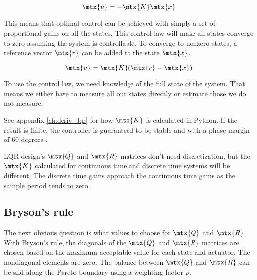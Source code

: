 \begin{theorem}
  \label{thm:optimal_control_law}

  \begin{equation}
    \mtx{u} = -\mtx{K}\mtx{x}
  \end{equation}
\end{theorem}

This means that optimal control can be achieved with simply a set of
proportional gains on all the \glspl{state}. This \gls{control law} will make
all \glspl{state} converge to zero assuming the \gls{system} is controllable. To
converge to nonzero \glspl{state}, a \gls{reference} vector $\mtx{r}$ can be
added to the \gls{state} $\mtx{x}$.

\begin{theorem}
  \begin{equation}
    \mtx{u} = \mtx{K}(\mtx{r} - \mtx{x})
  \end{equation}
\end{theorem}

To use the \gls{control law}, we need knowledge of the full \gls{state} of the
\gls{system}. That means we either have to measure all our \glspl{state}
directly or estimate those we do not measure.

See appendix \ref{ch:deriv_lqr} for how $\mtx{K}$ is calculated in Python. If
the result is finite, the controller is guaranteed to be stable and
 with a \gls{phase margin} of 60 degrees
\cite{bib:lqr_phase_margin}.

\begin{remark}
  LQR design's $\mtx{Q}$ and $\mtx{R}$ matrices don't need \gls{discretization},
  but the $\mtx{K}$ calculated for continuous time and discrete time
  \glspl{system} will be different. The discrete time gains approach the
  continuous time gains as the sample period tends to zero.
\end{remark}

\subsection{Bryson's rule}

The next obvious question is what values to choose for $\mtx{Q}$ and $\mtx{R}$.
With Bryson's rule, the diagonals of the $\mtx{Q}$ and $\mtx{R}$ matrices are
chosen based on the maximum acceptable value for each \gls{state} and actuator.
The nondiagonal elements are zero. The balance between $\mtx{Q}$ and $\mtx{R}$
can be slid along the Pareto boundary using a weighting factor $\rho$.

